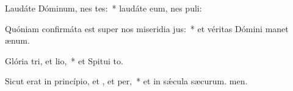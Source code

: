\item Laudáte Dóminum, nes tes:~* laudáte eum, nes puli:
\item Quóniam confirmáta est super nos miseridia jus:~* et véritas Dómini manet  ænum.
\item Glória tri, et lio,~* et Spitui to.
\item Sicut erat in princípio, et , et per,~* et in sǽcula sæcurum. men.
